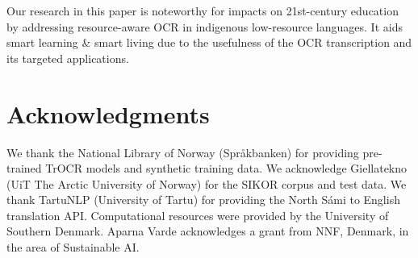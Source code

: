 \documentclass[conference]{IEEEtran}
\begin{document}
Our research in this paper is noteworthy for impacts on 21st-century education by addressing resource-aware OCR in indigenous low-resource languages. It aids smart learning \& smart living due to the usefulness of the OCR transcription and its targeted applications. 



\section*{Acknowledgments}
\footnotesize

We thank the National Library of Norway (Spr\r{a}kbanken) for providing pre-trained TrOCR models and synthetic training data. We acknowledge Giellatekno (UiT The Arctic University of Norway) for the SIKOR corpus and test data. We thank TartuNLP (University of Tartu) for providing the North S\'{a}mi to English translation API. Computational resources were provided by the University of Southern Denmark. Aparna Varde acknowledges a grant from NNF, Denmark, in the area of Sustainable AI. 


\balance


\end{document}
